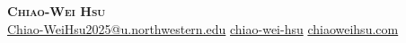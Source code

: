 
\begin{center}
  \textbf{\Huge \scshape Chiao-Wei Hsu} \\ 
  \vspace{5pt plus 2pt minus 2pt} \small \faPhone\hspace{1pt}  
  \hspace{10pt} \faEnvelope\hspace{2pt}\href{mailto:Chiao-WeiHsu2025@u.northwestern.edu} {Chiao-WeiHsu2025@u.northwestern.edu}
  \hspace{10pt} \faLinkedin\hspace{2pt}\href{https://linkedin.com/in/chiao-wei-hsu}{chiao-wei-hsu}
  \hspace{10pt} \faGlobe\hspace{2pt}\href{https://chiaoweihsu.com}{chiaoweihsu.com}
\end{center}